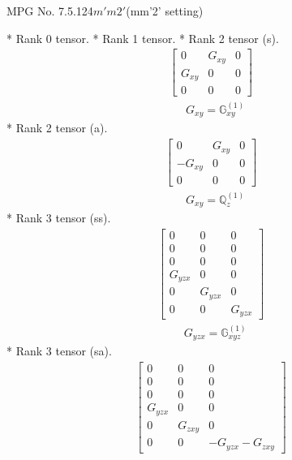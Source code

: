 \documentclass[fleqn,8pt,landscape]{jsarticle}
\begin{document}
\setcounter{MaxMatrixCols}{32}

\renewcommand{\tablename}{Table~}
\renewcommand{\figurename}{Figure~}
\begin{center}
\LARGE
MPG No. 7.5.124\quad$m'm2'$\quad(mm'2' setting)
\end{center}
* Rank 0 tensor.
* Rank 1 tensor.
* Rank 2 tensor (s).
\begin{align*}
\begin{bmatrix} 0 & G_{xy} & 0 \\ G_{xy} & 0 & 0 \\ 0 & 0 & 0 \end{bmatrix}
\end{align*}
\begin{align*}
& G_{xy} = \mathbb{G}_{xy}^{(1)}
\end{align*}
* Rank 2 tensor (a).
\begin{align*}
\begin{bmatrix} 0 & G_{xy} & 0 \\ - G_{xy} & 0 & 0 \\ 0 & 0 & 0 \end{bmatrix}
\end{align*}
\begin{align*}
& G_{xy} = \mathbb{Q}_{z}^{(1)}
\end{align*}
* Rank 3 tensor (ss).
\begin{align*}
\begin{bmatrix} 0 & 0 & 0 \\ 0 & 0 & 0 \\ 0 & 0 & 0 \\ G_{yzx} & 0 & 0 \\ 0 & G_{yzx} & 0 \\ 0 & 0 & G_{yzx} \end{bmatrix}
\end{align*}
\begin{align*}
& G_{yzx} = \mathbb{G}_{xyz}^{(1)}
\end{align*}
* Rank 3 tensor (sa).
\begin{align*}
\begin{bmatrix} 0 & 0 & 0 \\ 0 & 0 & 0 \\ 0 & 0 & 0 \\ G_{yzx} & 0 & 0 \\ 0 & G_{zxy} & 0 \\ 0 & 0 & - G_{yzx} - G_{zxy} \end{bmatrix}
\end{align*}
\end{document}
